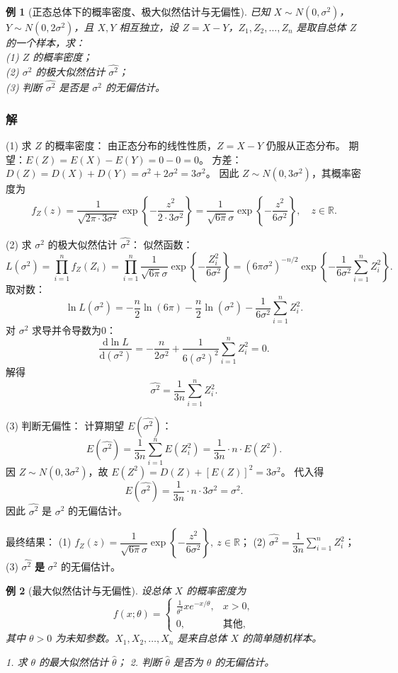 \documentclass[11pt,a4paper,oneside,openany]{book}
\theoremstyle{yhbthm}
\newtheorem{example}{例}[section]
\begin{document}
\begin{example}[正态总体下的概率密度、极大似然估计与无偏性]
已知 $X \sim N(0,\sigma^2)$，$Y \sim N(0,2\sigma^2)$，且 $X,Y$ 相互独立，设 $Z = X - Y$，$Z_1,Z_2,\dots,Z_n$ 是取自总体 $Z$ 的一个样本，求：\\
(1) $Z$ 的概率密度；\\
(2) $\sigma^2$ 的极大似然估计 $\hat{\sigma^2}$；\\
(3) 判断 $\hat{\sigma^2}$ 是否是 $\sigma^2$ 的无偏估计。
\end{example}

\subsubsection{解}
(1) 求 $Z$ 的概率密度：
由正态分布的线性性质，$Z = X - Y$ 仍服从正态分布。
期望：$E(Z) = E(X) - E(Y) = 0 - 0 = 0$。
方差：$D(Z) = D(X) + D(Y) = \sigma^2 + 2\sigma^2 = 3\sigma^2$。
因此 $Z \sim N(0, 3\sigma^2)$，其概率密度为
\[
f_Z(z) = \frac{1}{\sqrt{2\pi \cdot 3\sigma^2}} \exp\left\{-\frac{z^2}{2 \cdot 3\sigma^2}\right\} = \frac{1}{\sqrt{6\pi}\sigma} \exp\left\{-\frac{z^2}{6\sigma^2}\right\},\quad z \in \mathbb{R}.
\]

(2) 求 $\sigma^2$ 的极大似然估计 $\hat{\sigma^2}$：
似然函数：
\[
L(\sigma^2) = \prod_{i=1}^n f_Z(Z_i) = \prod_{i=1}^n \frac{1}{\sqrt{6\pi}\sigma} \exp\left\{-\frac{Z_i^2}{6\sigma^2}\right\}
= (6\pi\sigma^2)^{-n/2} \exp\left\{-\frac{1}{6\sigma^2} \sum_{i=1}^n Z_i^2\right\}.
\]
取对数：
\[
\ln L(\sigma^2) = -\frac{n}{2}\ln(6\pi) - \frac{n}{2}\ln(\sigma^2) - \frac{1}{6\sigma^2} \sum_{i=1}^n Z_i^2.
\]
对 $\sigma^2$ 求导并令导数为0：
\[
\frac{\mathrm{d}\ln L}{\mathrm{d}(\sigma^2)} = -\frac{n}{2\sigma^2} + \frac{1}{6(\sigma^2)^2} \sum_{i=1}^n Z_i^2 = 0.
\]
解得
\[
\hat{\sigma^2} = \frac{1}{3n} \sum_{i=1}^n Z_i^2.
\]

(3) 判断无偏性：
计算期望 $E(\hat{\sigma^2})$：
\[
E(\hat{\sigma^2}) = \frac{1}{3n} \sum_{i=1}^n E(Z_i^2) = \frac{1}{3n} \cdot n \cdot E(Z^2).
\]
因 $Z \sim N(0, 3\sigma^2)$，故 $E(Z^2) = D(Z) + [E(Z)]^2 = 3\sigma^2$。
代入得
\[
E(\hat{\sigma^2}) = \frac{1}{3n} \cdot n \cdot 3\sigma^2 = \sigma^2.
\]
因此 $\hat{\sigma^2}$ 是 $\sigma^2$ 的无偏估计。

最终结果：
(1) $\boxed{f_Z(z) = \dfrac{1}{\sqrt{6\pi}\sigma} \exp\left\{-\dfrac{z^2}{6\sigma^2}\right\},\ z \in \mathbb{R}}$；
(2) $\boxed{\hat{\sigma^2} = \dfrac{1}{3n} \sum_{i=1}^n Z_i^2}$；
(3) $\hat{\sigma^2}$ \textbf{是} $\sigma^2$ 的无偏估计。

\begin{example}[最大似然估计与无偏性]
设总体 $X$ 的概率密度为
\[
f(x;\theta) = 
\begin{cases}
\displaystyle \frac{1}{\theta^2} x e^{-x/\theta}, & x>0, \\
0, & \text{其他},
\end{cases}
\]
其中 $\theta > 0$ 为未知参数。$X_1,X_2,\dots,X_n$ 是来自总体 $X$ 的简单随机样本。

1. 求 $\theta$ 的最大似然估计 $\hat\theta$；
2. 判断 $\hat\theta$ 是否为 $\theta$ 的无偏估计。
\end{example}
\end{document}
